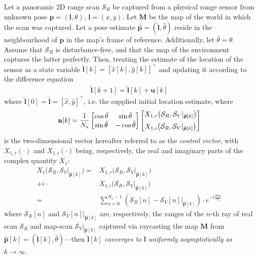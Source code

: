 \begin{theorem}
  \label{prop:theorem_without_disturbance}
  Let a panoramic 2D range scan $\mathcal{S}_R$ be captured from a physical
  range sensor from unknown pose $\bm{p} = (\bm{l},\theta)$, $\bm{l} = (x,y)$.
  Let $\bm{M}$ be the map of the world in which the scan was captured. Let a
  pose estimate $\hat{\bm{p}} = (\hat{\bm{l}}, \hat{\theta})$ reside in the
  neighbourhood of $\bm{p}$ in the map's frame of reference. Additionally, let
  $\hat{\theta} = \theta$. Assume that $\mathcal{S}_R$ is disturbance-free,
  and that the map of the environment captures the latter perfectly. Then,
  treating the estimate of the location of the sensor as a state variable
  $\hat{\bm{l}}[k] = [\hat{x}[k], \hat{y}[k]]^\top$ and updating it according
  to the difference equation
  \begin{align}
    \hat{\bm{l}}[k+1] = \hat{\bm{l}}[k] + \bm{u}[k]
    \label{eq:difference_equation_without_disturbance}
  \end{align}
  where $\hat{\bm{l}}[0] = \hat{\bm{l}} = [\hat{x}, \hat{y}]^{\top}$,
  i.e. the supplied initial location estimate, where
  \begin{align}
    \bm{u}[k] = \dfrac{1}{N_s}
    \begin{bmatrix}
      \cos\hat{\theta} & \sin\hat{\theta} \\
      \sin\hat{\theta} & - \cos\hat{\theta}
    \end{bmatrix}
    \begin{bmatrix}
      X_{1,r}\big(\mathcal{S}_R, \mathcal{S}_V|_{\bm{\hat{p}}[k]}\big) \vspace{0.2cm} \\
      X_{1,i}\big(\mathcal{S}_R, \mathcal{S}_V|_{\bm{\hat{p}}[k]}\big)
    \end{bmatrix}
    \label{eq:control_vector_without_disturbance}
  \end{align}
  is the two-dimensional vector hereafter referred to as the
  \textit{control vector}, with
  $X_{1,r}(\cdot)$ and $X_{1,i}(\cdot)$ being, respectively, the real and
  imaginary parts of the complex quantity $X_1$:
  \begin{align}
    X_1\big(\mathcal{S}_R, \mathcal{S}_V|_{\bm{\hat{p}}[k]}\big) =
      &X_{1,r}\big(\mathcal{S}_R, \mathcal{S}_V|_{\bm{\hat{p}}[k]}\big) \nonumber \\
      + i \cdot &X_{1,i}\big(\mathcal{S}_R, \mathcal{S}_V|_{\bm{\hat{p}}[k]}\big) \nonumber \\
      = &\sum\limits_{n=0}^{N_s-1}(\mathcal{S}_R[n] - \mathcal{S}_V[n]|_{\bm{\hat{p}}[k]}) \cdot e^{-i \frac{2 \pi n}{N_s}} \label{eq:X1}
  \end{align}
  where $\mathcal{S}_R[n]$ and $\mathcal{S}_V[n]|_{\bm{\hat{p}}[k]}$ are,
  respectively, the ranges of the $n$-th ray of real scan $\mathcal{S}_R$ and
  map-scan $\mathcal{S}_V|_{\bm{\hat{p}}[k]}$ captured via raycasting the map
  $\bm{M}$ from $\bm{\hat{p}}[k] = (\hat{\bm{l}}[k], \hat{\theta})$---then
  $\hat{\bm{l}}[k]$ \textit{converges to} $\bm{l}$ \textit{uniformly
  asymptotically as} $k \rightarrow \infty$.
\end{theorem}

